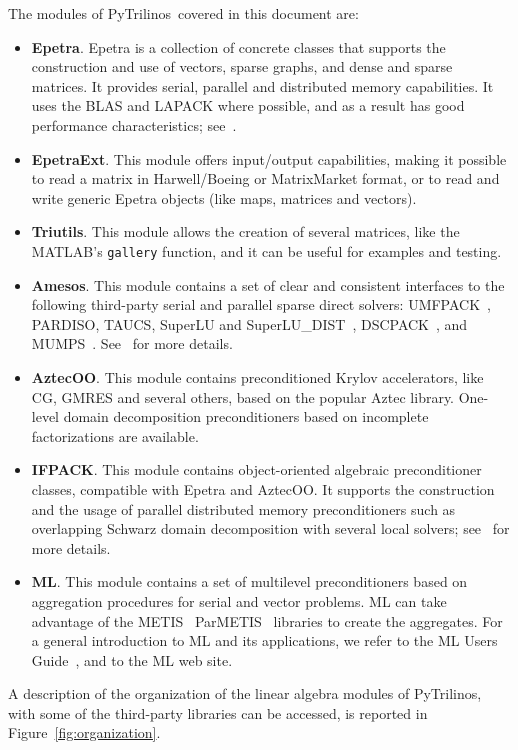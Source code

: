 \documentclass[10pt,relax]{SANDreport}
\newcommand{\PyTrilinos}{{PyTrilinos}}
\begin{document}
The modules of \PyTrilinos\ covered in this document are:
\begin{itemize}
\item {\bf Epetra}. Epetra is a collection
of concrete classes that supports the construction and use of vectors, sparse
graphs, and dense and sparse matrices. It provides serial, parallel and
distributed memory capabilities. It uses the BLAS and LAPACK where possible,
  and as a result has good performance characteristics;
see~\cite{Epetra-Ref-Guide}.
%
\item {\bf EpetraExt}. This module offers input/output
capabilities, making it possible to read a matrix in Harwell/Boeing or
MatrixMarket format, or to read and write generic Epetra objects 
(like maps, matrices and vectors).
%
\item {\bf Triutils}. This module allows the creation of several matrices, 
  like the MATLAB's {\tt gallery} function, and it can be useful for examples
  and testing. 
%
\item {\bf Amesos}. This module contains a set of clear and consistent
interfaces to the following third-party serial and parallel sparse direct
solvers:
UMFPACK~\cite{umfpack-home-page},
PARDISO,
TAUCS,
SuperLU and SuperLU\_DIST~\cite{superlu-manual},
DSCPACK~\cite{dscpack-manual}, and 
MUMPS~\cite{mumps-manual}. See~\cite{Amesos-Reference-Guide} for more details. 
%
\item {\bf AztecOO}. This module contains preconditioned Krylov accelerators,
like CG, GMRES and several others, based on the popular Aztec library.
One-level domain decomposition preconditioners based on incomplete
factorizations are available.
%
\item {\bf IFPACK}. This module contains object-oriented algebraic
preconditioner
classes, compatible with Epetra and AztecOO.  It supports the construction and
the usage of parallel distributed memory preconditioners such as overlapping
Schwarz domain decomposition with several local solvers;
see~\cite{ifpack-guide} for more details.
%
\item {\bf ML}. This module contains a set of multilevel preconditioners based
on aggregation procedures for serial and vector problems. ML can take
advantage of the 
METIS~\cite{metis}
ParMETIS~\cite{parmetis} libraries to create the aggregates.
For a general introduction to ML and its applications, we refer to
the ML Users Guide~\cite{ml-guide}, and to the ML web site.
\end{itemize}

A description of the organization of  the linear algebra modules of
PyTrilinos, with some of the third-party libraries can be accessed,
is reported in Figure~\ref{fig:organization}.
\end{document}
